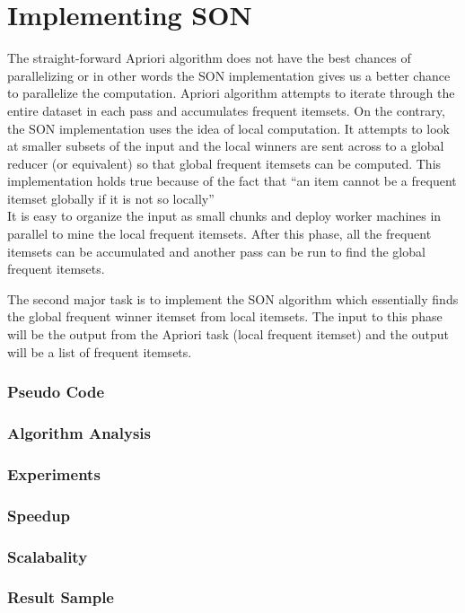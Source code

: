 \documentclass[11pt]{article}
\begin{document}
\section{Implementing SON}
The straight-forward Apriori algorithm does not have the best chances of parallelizing or in other words the SON implementation gives us a better chance to parallelize the computation. Apriori algorithm attempts to iterate through the entire dataset in each pass and accumulates frequent itemsets. On the contrary, the SON implementation uses the idea of local computation. It attempts to look at smaller subsets of the input and the local winners are sent across to a global reducer (or equivalent) so that global frequent itemsets can be computed. This implementation holds true because of the fact that “an item cannot be a frequent itemset globally if it is not so locally”\\
It is easy to organize the input as small chunks and deploy worker machines in parallel to mine the local frequent itemsets. After this phase, all the frequent itemsets can be accumulated and another pass can be run to find the global frequent itemsets.

The second major task is to implement the SON algorithm which essentially finds the global frequent winner itemset from local itemsets. The input to this phase will be the output from the Apriori task (local frequent itemset) and the output will be a list of frequent itemsets.\\
\subsubsection {Pseudo Code}
\subsubsection {Algorithm Analysis}
\subsubsection {Experiments}
\subsubsection {Speedup}
\subsubsection {Scalabality}
\subsubsection {Result Sample}
\end{document}
